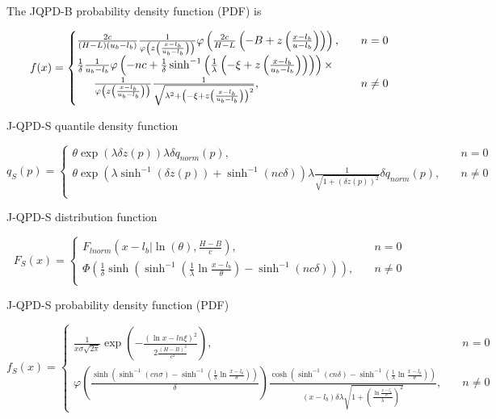 \documentclass[
  letterpaper,
  DIV=11,
  numbers=noendperiod]{scrartcl}
\begin{document}
The JQPD-B probability density function (PDF) is

\[
\begin{gathered}
f(x)=\begin{cases}
\frac{2c}{(H-L)(u_b-l_b)}\frac{1}{\varphi\left(z\left(\frac{x-l_b}{u_b-l_b}\right)\right)}\varphi\left(\frac{2c}{H-L}\left(-B+z\left(\frac{x-l_b}{u-l_b}\right)\right)\right), \quad &n=0\\
\frac{1}{\delta}\frac{1}{u_b-l_b}\varphi\left(-nc+\frac{1}{\delta}\sinh^{-1}\left(\frac{1}{\lambda}\left(-\xi+z\left(\frac{x-l_b}{u_b-l_b}\right)\right)\right)\right) \times \\ \indent
\frac{1}{\varphi\left(z\left(\frac{x-l_b}{u_b-l_b}\right)\right)}\frac{1}{\sqrt{\lambda^2+\left(-\xi+z\left(\frac{x-l_b}{u_b-l_b}\right)\right)^2}}, \quad &n\neq 0\\
\end{cases}
\end{gathered}
\]

J-QPD-S quantile density function

\[
q_S(p)=\begin{cases}
\theta\exp\left(\lambda\delta z(p)\right)\lambda\delta q_{norm}(p), \quad &n=0\\
\theta\exp\left(\lambda\sinh^{-1}(\delta z(p))+\sinh^{-1}(nc\delta)\right)\lambda\frac{1}{\sqrt{1+(\delta z(p))^2}}\delta q_{norm}(p), \quad &n\neq0\\
\end{cases}
\]

J-QPD-S distribution function

\[
F_S(x)=\begin{cases}
F_{lnorm}(x-l_b\vert \ln(\theta), \frac{H-B}{c}), \quad &n=0\\
\Phi\left(\frac{1}{\delta}\sinh\left(\sinh^{-1}\left(\frac{1}{\lambda}\ln\frac{x-l_b}{\theta}\right)-\sinh^{-1}(nc\delta)\right)\right), \quad &n\neq0\\
\end{cases}
\]

J-QPD-S probability density function (PDF)

\[
f_S(x)=\begin{cases}
\frac{1}{x\sigma\sqrt{2\pi}}\exp\left(-\frac{(\ln x-ln\xi)^2}{2\frac{(H-B)^2}{c^2}}\right), \quad &n=0\\
\varphi\left(\frac{\sinh(\sinh^{-1}(cn\sigma)-\sinh^{-1}(\frac{1}{\lambda}\ln\frac{x-l_b}{\theta}))}{\delta}\right)\frac{\cosh(\sinh^{-1}(cn\delta)-\sinh^{-1}(\frac{1}{\lambda}\ln\frac{x-l_b}{\theta}))}{(x-l_b)\delta\lambda\sqrt{1+\left(\frac{\ln\frac{x-l_b}{\theta}}{\lambda}\right)^2}}, \quad &n \neq 0
\end{cases}
\]
\end{document}
